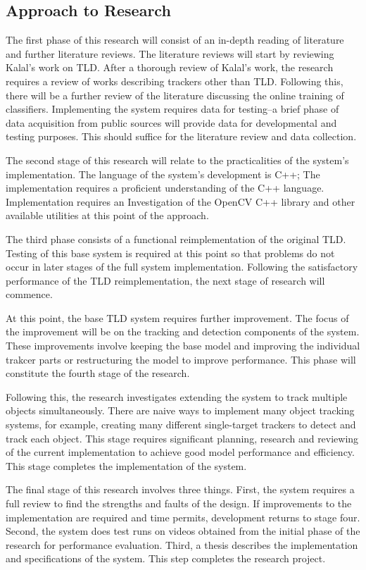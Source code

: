 \subsection{Approach to Research}
  The first phase of this research will consist of an in-depth reading of literature and further literature reviews.
  The literature reviews will start by reviewing Kalal's work on TLD.
  After a thorough review of Kalal's work, the research requires a review of works describing trackers other than TLD.
  Following this, there will be a further review of the literature discussing the online training of classifiers.
  Implementing the system requires data for testing--a brief phase of data acquisition from public sources will provide data for developmental and testing purposes.
  This should suffice for the literature review and data collection.

  The second stage of this research will relate to the practicalities of the system's implementation.
  The language of the system's development is C++; The implementation requires a proficient understanding of the C++ language.
  Implementation requires an Investigation of the OpenCV C++ library and other available utilities at this point of the approach.

  The third phase consists of a functional reimplementation of the original TLD.
  Testing of this base system is required at this point so that problems do not occur in later stages of the full system implementation.
  Following the satisfactory performance of the TLD reimplementation, the next stage of research will commence.

  At this point, the base TLD system requires further improvement.
  The focus of the improvement will be on the tracking and detection components of the system. 
  These improvements involve keeping the base model and improving the individual trakcer parts or restructuring the model to improve performance.
  This phase will constitute the fourth stage of the research.

  Following this, the research investigates extending the system to track multiple objects simultaneously.
  There are naive ways to implement many object tracking systems, for example, creating many different single-target trackers to detect and track each object. 
  This stage requires significant planning, research and reviewing of the current implementation to achieve good model performance and efficiency.
  This stage completes the implementation of the system.

  The final stage of this research involves three things.
  First, the system requires a full review to find the strengths and faults of the design.
  If improvements to the implementation are required and time permits, development returns to stage four.
  Second, the system does test runs on videos obtained from the initial phase of the research for performance evaluation.
  Third, a thesis describes the implementation and specifications of the system.
  This step completes the research project.
